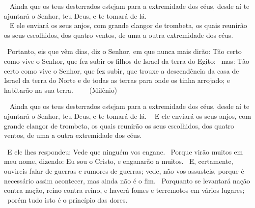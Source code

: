 \documentclass[12pt,aspectratio=169]{beamer}
\newcommand{\ver}[1]{%
    \raisebox{0.50ex}{%
        \scalebox{1.1}{%
            \pmb{\textbf{\textcolor{BSpbg}{#1}}}%
        }%
    }%
}
\newcommand{\QUOTE}[1]{%
    \par\noindent\hspace*{0.1\linewidth}%
    \begin{minipage}{0.8\linewidth}%
        \linespread{1.35}\large{#1}%
    \end{minipage}%
}
\newcommand{\WIDEQUOTE}[1]{%
    \par\noindent\hspace*{0.02\linewidth}%
    \begin{minipage}{0.92\linewidth}%
        \linespread{1.25}\large{#1}%
    \end{minipage}%
}
\newcommand{\RED}[1]{{\textcolor{TXred}{#1}}}
\newcommand{\ORA}[1]{{\textcolor{TXora}{#1}}}
\newcommand{\YEL}[1]{{\textcolor{TXyel}{#1}}}
\newcommand{\GRE}[1]{{\textcolor{TXgre}{#1}}}
\newcommand{\CYA}[1]{{\textcolor{TXcya}{#1}}}
\newcommand{\BLU}[1]{{\textcolor{TXblu}{#1}}}
\newcommand{\MAG}[1]{{\textcolor{TXmag}{#1}}}
\newcommand{\BRI}[1]{{\textcolor{BSpbg}{#1}}}   %
\begin{document}
    \begin{frame}
        \QUOTE{%
            \ver{(ARA) Dt~30.4}~%
            Ainda  que  os   teus   \BLU{des}\BRI{ter}\BLU{ra}\BRI{dos}   estejam   para   a
            \GRE{extremidade dos céus}, desde aí te \ORA{ajuntará} o Senhor, teu Deus, e  te
            tomará de lá. \\[\bigskipamount]
            \ver{(ARA) Mt~24.31}~%
            E ele enviará os seus \YEL{anjos}, com grande  clangor  de  trombeta,  os  quais
            \ORA{reunirão} os seus \BLU{es}\BRI{co}\BLU{lhi}\BRI{dos},  dos  quatro  ventos,
            de uma a outra \GRE{extremidade dos céus}.
        }
    \end{frame}

    \begin{frame}
        \QUOTE{%
            \ver{(ARA) Jr~23.7}~Portanto, eis que vêm dias, diz o Senhor, em que nunca  mais
            dirão: Tão certo como vive o Senhor, que fez \YEL{subir os filhos de  Israel  da
            terra do Egito}; \ver{8}~mas: Tão certo como vive o Senhor, que fez  subir,  que
            \MAG{trouxe a descendência da casa de Israel da terra do Norte  e  de  todas  as
            terras  para  onde  os  tinha  arrojado};  \GRE{e  habitarão  na   sua   terra}.
            $\qquad$(\GRE{Milênio})
        }
    \end{frame}

    \begin{frame}
        \QUOTE{%
            \ver{(ARA) Dt~30.4}~%
            Ainda  que  os   teus   \BLU{des}\BRI{ter}\BLU{ra}\BRI{dos}   estejam   para   a
            \GRE{extremidade dos céus}, desde aí te \ORA{ajuntará} o Senhor, teu Deus, e  te
            tomará de lá.
            \ver{(ARA) Mt~24.31}~%
            E ele enviará os seus \YEL{anjos}, com grande  clangor  de  trombeta,  os  quais
            \ORA{reunirão} os seus \BLU{es}\BRI{co}\BLU{lhi}\BRI{dos},  dos  quatro  ventos,
            de uma a outra \GRE{extremidade dos céus}.
        }
    \end{frame}

    \begin{frame}
        \WIDEQUOTE{%
            \ver{(ARA) Mt~24.4}~E ele lhes respondeu: Vede  que  ninguém  vos  \RED{engane}.
            \ver{5}~Porque  virão  muitos  em  meu  nome,  dizendo:  Eu  sou  o  Cristo,   e
            \RED{enganarão} a muitos. \ver{6}~E, certamente, ouvireis falar de \ORA{guerras}
            e \ORA{rumores de guerras}; vede, não vos assusteis, porque é  necessário  assim
            acontecer, mas ainda não é o \BLU{fim}.  \ver{7}~Porquanto  se  levantará  nação
            \ORA{contra}  nação,  reino  \ORA{contra}  reino,   e   haverá   \YEL{fomes}   e
            \GRE{terremotos} em \YEL{vários} \GRE{lugares};  \ver{8}~porém  tudo  isto  é  o
            \CYA{princípio das dores}.
        }
    \end{frame}
\end{document}
